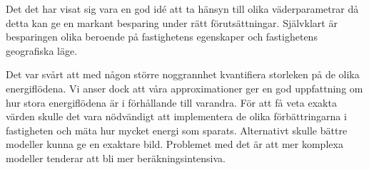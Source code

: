 Det det har visat sig vara en god idé att ta hänsyn till olika väderparametrar då
detta kan ge en markant besparing under rätt förutsättningar. Självklart är
besparingen olika beroende på fastighetens egenskaper och fastighetens geografiska läge.

Det var svårt att med någon större noggrannhet kvantifiera storleken på de olika energiflödena. Vi
anser dock att våra approximationer ger en god uppfattning om hur stora energiflödena är i förhållande
till varandra. För att få veta exakta värden skulle det vara nödvändigt att implementera de olika
förbättringarna i fastigheten och mäta hur mycket energi som sparats. Alternativt skulle
bättre modeller kunna ge en exaktare bild. Problemet med det är att mer komplexa modeller tenderar att
bli mer beräkningsintensiva.

